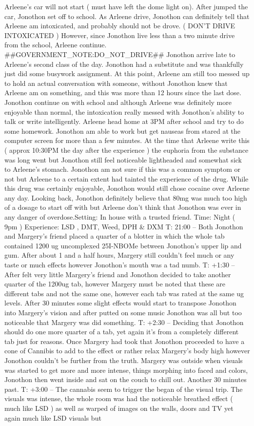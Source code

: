 \documentclass[12pt]{book}
\begin{document}
Arleene's car will not start ( must have left the dome light on). After jumped the car, Jonothon set off to school. As Arleene drive, Jonothon can definitely tell that Arleene am intoxicated, and probably should not be drove. ( DON'T DRIVE INTOXICATED ) However, since Jonothon live less than a two minute drive from the school, Arleene continue. \#\#GOVERNMENT\_NOTE:DO\_NOT\_DRIVE\#\# Jonothon arrive late to Arleene's second class of the day. Jonothon had a substitute and was thankfully just did some busywork assignment. At this point, Arleene am still too messed up to hold an actual conversation with someone, without Jonothon knew that Arleene am on something, and this was more than 12 hours since the last dose. Jonothon continue on with school and although Arleene was definitely more enjoyable than normal, the intoxication really messed with Jonothon's ability to talk or write intelligently. Arleene head home at 3PM after school and try to do some homework. Jonothon am able to work but get nauseas from stared at the computer screen for more than a few minutes. At the time that Arleene write this ( approx 10:30PM the day after the experience ) the euphoria from the substance was long went but Jonothon still feel noticeable lightheaded and somewhat sick to Arleene's stomach. Jonothon am not sure if this was a common symptom or not but Arleene to a certain extent had tainted the experience of the drug. While this drug was certainly enjoyable, Jonothon would still chose cocaine over Arleene any day. Looking back, Jonothon definitely believe that 80mg was much too high of a dosage to start off with but Arleene don't think that Jonothon was ever in any danger of overdose.Setting: In house with a trusted friend. Time: Night ( 9pm ) Experience: LSD , DMT, Weed, DPH \& DXM T: 21:00 -- Both Jonothon and Margery's friend placed a quarter of a blotter in which the whole tab contained 1200 ug uncomplexed 25I-NBOMe between Jonothon's upper lip and gum. After about 1 and a half hours, Margery still couldn't feel much or any taste or much effects however Jonothon's mouth was a tad numb. T: +1:30 -- After felt very little Margery's friend and Jonothon decided to take another quarter of the 1200ug tab, however Margery must be noted that these are different tabs and not the same one, however each tab was rated at the same ug levels. After 30 minutes some slight effects would start to transpose Jonothon into Margery's vision and after putted on some music Jonothon was all but too noticeable that Margery was did something. T: +2:30 -- Deciding that Jonothon should do one more quarter of a tab, yet again it's from a completely different tab just for reasons. Once Margery had took that Jonothon proceeded to have a cone of Cannibis to add to the effect or rather relax Margery's body high however Jonothon couldn't be further from the truth. Margery was outside when visuals was started to get more and more intense, things morphing into faced and colors, Jonothon then went inside and sat on the couch to chill out. Another 30 minutes past. T: +3:00 -- The cannabis seem to trigger the began of the visual trip. The visuals was intense, the whole room was had the noticeable breathed effect ( much like LSD ) as well as warped of images on the walls, doors and TV yet again much like LSD visuals but 
\end{document}
